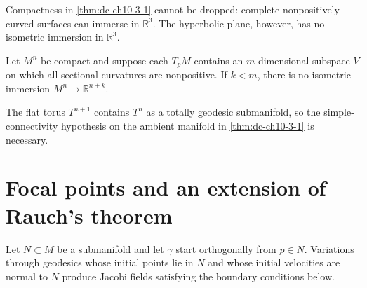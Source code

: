 \begin{remark}
  \label{rem:dc-ch10-3-6}
  Compactness in \cref{thm:dc-ch10-3-1} cannot be dropped: complete nonpositively
  curved surfaces can immerse in $\mathbb R^3$. The hyperbolic plane, however, has
  no isometric immersion in $\mathbb R^3$.
\end{remark}

\begin{remark}
  \label{rem:dc-ch10-3-7}
  Let $M^n$ be compact and suppose each $T_pM$ contains an $m$-dimensional subspace
  $V$ on which all sectional curvatures are nonpositive. If $k<m$, there is no
  isometric immersion $M^n\to\mathbb R^{n+k}$.
\end{remark}

\begin{remark}
  \label{rem:dc-ch10-3-8}
  The flat torus $T^{n+1}$ contains $T^n$ as a totally geodesic submanifold, so the
  simple-connectivity hypothesis on the ambient manifold in
  \cref{thm:dc-ch10-3-1} is necessary.
\end{remark}

\section{Focal points and an extension of Rauch's theorem}

Let $N\subset M$ be a submanifold and let $\gamma$ start orthogonally from
$p\in N$. Variations through geodesics whose initial points lie in $N$ and whose
initial velocities are normal to $N$ produce Jacobi fields satisfying the boundary
conditions below.

